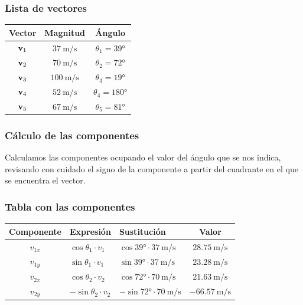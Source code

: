 \documentclass[12pt]{beamer}
\begin{document}
\begin{frame}
\frametitle{Lista de vectores}
\begin{table}
\centering
\begin{tabular}{c | c | c }
Vector & Magnitud & Ángulo \\ \hline
$\vb{v}_{1}$ & $\SI{37}{\meter\per\second}$ & $\theta_{1} = \ang{39}$ \\ \hline
$\vb{v}_{2}$ & $\SI{70}{\meter\per\second}$ & $\theta_{2} = \ang{72}$ \\ \hline
$\vb{v}_{3}$ & $\SI{100}{\meter\per\second}$ & $\theta_{3} = \ang{19}$ \\ \hline
$\vb{v}_{4}$ & $\SI{52}{\meter\per\second}$ & $\theta_{4} = \ang{180}$ \\ \hline
$\vb{v}_{5}$ & $\SI{67}{\meter\per\second}$ & $\theta_{5} = \ang{81}$ \\ \hline
\end{tabular}
\end{table}
\end{frame}
\begin{frame}
\frametitle{Cálculo de las componentes}
Calculamos las componentes ocupando el valor del ángulo que se nos indica, revisando con cuidado el signo de la componente a partir del cuadrante en el que se encuentra el vector.
\end{frame}
\begin{frame}
\frametitle{Tabla con las componentes}
\begin{table}
\centering
\begin{tabular}{c | l | l | c}
Componente & Expresión & Sustitución & Valor \\ \hline
$v_{1x}$ & $\cos \theta_{1} \cdot v_{1}$ & $\cos \ang{39} \cdot \SI{37}{\meter\per\second}$ & $\SI{28.75}{\meter\per\second}$ \\ \hline
$v_{1y}$ & $\sin \theta_{1} \cdot v_{1}$ & $\sin \ang{39} \cdot \SI{37}{\meter\per\second}$ & $\SI{23.28}{\meter\per\second}$ \\ \hline
$v_{2x}$ & $\cos \theta_{2} \cdot v_{2}$ & $\cos \ang{72} \cdot \SI{70}{\meter\per\second}$ & $\SI{21.63}{\meter\per\second}$ \\ \hline
$v_{2y}$ & $-\sin \theta_{2} \cdot v_{2}$ & $-\sin \ang{72} \cdot \SI{70}{\meter\per\second}$ & $-\SI{66.57}{\meter\per\second}$ \\ \hline
\end{tabular}
\end{table}
\end{frame}
\end{document}
